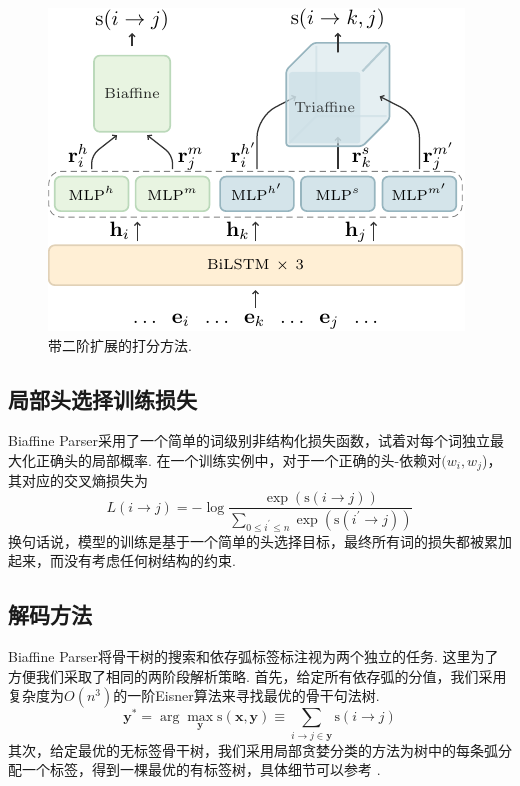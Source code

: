 \begin{figure}[tb]
  \centering
  \includegraphics[scale=1.5]{figures/dep-framework.pdf}
  \caption{带二阶扩展的打分方法.}
  \label{fig:dep-framework}
\end{figure}

\subsection{局部头选择训练损失}
Biaffine Parser采用了一个简单的词级别非结构化损失函数，试着对每个词独立最大化正确头的局部概率.
在一个训练实例中，对于一个正确的头-依赖对$(w_i, w_j$)，其对应的交叉熵损失为
\begin{equation} \label{eq:biaffine-loss}
  \mathit{L}(i\rightarrow j) = -\log{\frac{\exp(\mathrm{s}(i\rightarrow j))}{\sum_{0 \le i^{\prime} \le n} \exp(\mathrm{s}(i^{\prime}\rightarrow j))}}
\end{equation}
换句话说，模型的训练是基于一个简单的头选择目标，最终所有词的损失都被累加起来，而没有考虑任何树结构的约束.

\subsection{解码方法}
Biaffine Parser将骨干树的搜索和依存弧标签标注视为两个独立的任务.
这里为了方便我们采取了相同的两阶段解析策略.
首先，给定所有依存弧的分值，我们采用复杂度为$O(n^3)$的一阶Eisner算法来寻找最优的骨干句法树.
\begin{equation}
  \label{eq:map-decoding}
  {\boldsymbol{y}}^* = \arg\max_{\boldsymbol{y}} \mathrm{s}(\boldsymbol{x},\boldsymbol{y}) \equiv
  \sum_{i \rightarrow j \in \boldsymbol{y}}{\mathrm{s}(i\rightarrow j)}
\end{equation}
其次，给定最优的无标签骨干树，我们采用局部贪婪分类的方法为树中的每条弧分配一个标签，得到一棵最优的有标签树，具体细节可以参考 \citep{dozat-etal-2017-biaffine}.

